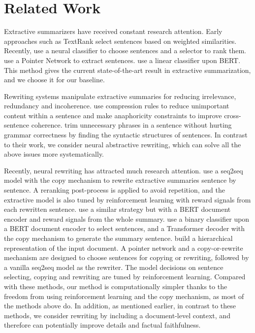 \documentclass[letterpaper]{article} %
\begin{document}
\section{Related Work}
\label{relwork}

Extractive summarizers have received constant research attention. Early approaches such as TextRank \cite{Mihalcea2004} select sentences based on weighted similarities. Recently, \citet{Nallapati2017} use a neural classifier to choose sentences and a selector to rank them. \citet{Chen2018} use a Pointer Network \cite{Vinyals2015} to extract sentences. \citet{Liu2019} use a linear classifier upon BERT. 
This method gives the current state-of-the-art result in extractive summarization, and we choose it for our baseline.

Rewriting systems manipulate extractive summaries for reducing irrelevance, redundancy and incoherence. \citet{Durrett2016} use compression rules to reduce unimportant content within a sentence and make anaphoricity constraints to improve cross-sentence coherence. \citet{Dorr2003} trim unnecessary phrases in a sentence without hurting grammar correctness by finding the syntactic structures of sentences. In contrast to their work, we consider neural abstractive rewriting, which can solve all the above issues more systematically.

Recently, neural rewriting has attracted much research attention.  \citet{Chen2018} use a seq2seq model with the copy mechanism \cite{See2017} to rewrite extractive summaries sentence by sentence. A reranking post-process is applied to avoid repetition, and the extractive model is also tuned by reinforcement learning with reward signals from each rewritten sentence. \citet{Bae2019} use a similar strategy but with a BERT document encoder and reward signals from the whole summary. \citet{Wei2019} use a binary classifier upon a BERT document encoder to select sentences, and a Transformer decoder \cite{Vaswani2017} with the copy mechanism to generate the summary sentence. \citet{Xiao2020} build a hierarchical representation of the input document. A pointer network and a copy-or-rewrite mechanism are designed to choose sentences for copying or rewriting, followed by a vanilla seq2seq model as the rewriter. The model decisions on sentence selecting, copying and rewriting are tuned by reinforcement learning. 
Compared with these methods, our method is computationally simpler thanks to the freedom from using reinforcement learning and the copy mechanism, as most of the methods above do. In addition, as mentioned earlier, in contrast to these methods, we consider rewriting by including a document-level context, and therefore can potentially improve details and factual faithfulness.
\end{document}
